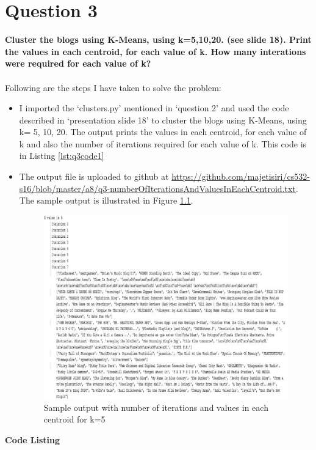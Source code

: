 \chapter{Question 3}
\label{available-representation}

\textbf{Cluster the blogs using K-Means, using k=5,10,20. (see slide 18).  Print the values in each centroid, for each value of k.  How many interations were required for each value of k?}\\\\

Following are the steps I have taken to solve the problem:
\begin{itemize}
\item I imported the `clusters.py' mentioned in `question 2' and used the code described in `presentation slide 18' to cluster the blogs using K-Means, using k= 5, 10, 20. The output prints the values in each centroid, for each value of k and also the number of iterations required for each value of k. This code is in Listing \ref{lst:q3code1} 
\newpage
\item The output file is uploaded to github at \url{https://github.com/majetisiri/cs532-s16/blob/master/a8/q3-numberOfIterationsAndValuesInEachCentroid.txt}. The sample output is illustrated in Figure \ref{fig:q3fig1}. 
\begin{figure}[h!]
\begin{center}
\includegraphics[scale=0.55, keepaspectratio=true]{figures/3.JPG}
\caption{Sample output with number of iterations and values in each centroid for k=5}
\label{fig:q3fig1}
\end{center}
\end{figure}
\end{itemize}


\newpage
\textbf{Code Listing}
\sloppy


